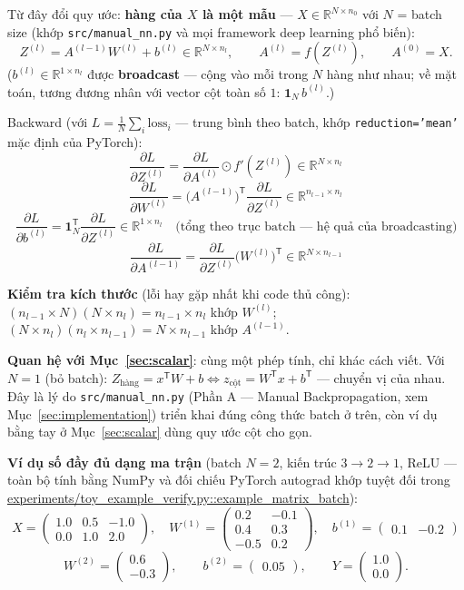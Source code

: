 \documentclass[12pt,a4paper]{report}
\newcommand{\T}{^{\mathsf{T}}}
\begin{document}
Từ đây đổi quy ước: \textbf{hàng của $X$ là một mẫu} ---
$X\in\mathbb R^{N\times n_0}$ với $N$ = batch size (khớp
\texttt{src/manual\_nn.py} và mọi framework deep learning phổ biến):
$$Z^{(l)} = A^{(l-1)}W^{(l)} + b^{(l)} \in \mathbb R^{N\times n_l},\qquad
A^{(l)} = f(Z^{(l)}),\qquad A^{(0)}=X.$$
($b^{(l)}\in\mathbb R^{1\times n_l}$ được \textbf{broadcast} --- cộng vào
mỗi trong $N$ hàng như nhau; về mặt toán, tương đương nhân với vector cột
toàn số $1$: $\mathbf 1_N\, b^{(l)}$.)

Backward (với $L=\tfrac1N\sum_i \mathrm{loss}_i$ --- trung bình theo batch,
khớp \texttt{reduction='mean'} mặc định của PyTorch):
$$\frac{\partial L}{\partial Z^{(l)}} = \frac{\partial L}{\partial A^{(l)}}\odot f'(Z^{(l)}) \in \mathbb R^{N\times n_l}$$
$$\frac{\partial L}{\partial W^{(l)}} = \big(A^{(l-1)}\big)\T\frac{\partial L}{\partial Z^{(l)}} \in \mathbb R^{n_{l-1}\times n_l}$$
$$\frac{\partial L}{\partial b^{(l)}} = \mathbf 1_N\T\frac{\partial L}{\partial Z^{(l)}} \in \mathbb R^{1\times n_l}\quad\text{(tổng theo trục batch --- hệ quả của broadcasting)}$$
$$\frac{\partial L}{\partial A^{(l-1)}} = \frac{\partial L}{\partial Z^{(l)}}\big(W^{(l)}\big)\T \in \mathbb R^{N\times n_{l-1}}$$

\textbf{Kiểm tra kích thước} (lỗi hay gặp nhất khi code thủ công):
$(n_{l-1}\times N)(N\times n_l)=n_{l-1}\times n_l$ khớp $W^{(l)}$;
$(N\times n_l)(n_l\times n_{l-1})=N\times n_{l-1}$ khớp $A^{(l-1)}$.

\textbf{Quan hệ với Mục~\ref{sec:scalar}}: cùng một phép tính, chỉ khác
cách viết. Với $N=1$ (bỏ batch): $Z_{\text{hàng}} = x\T W+b
\Leftrightarrow z_{\text{cột}} = W\T x+b\T$ --- chuyển vị của nhau. Đây là
lý do \texttt{src/manual\_nn.py} (Phần A --- Manual Backpropagation, xem
Mục~\ref{sec:implementation}) triển khai đúng công thức batch ở trên, còn
ví dụ bằng tay ở Mục~\ref{sec:scalar} dùng quy ước cột cho gọn.

\textbf{Ví dụ số đầy đủ dạng ma trận} (batch $N=2$, kiến trúc
$3\to2\to1$, ReLU --- toàn bộ tính bằng NumPy và đối chiếu PyTorch
autograd khớp tuyệt đối trong
\url{experiments/toy_example_verify.py::example_matrix_batch}):
$$X=\begin{pmatrix}1.0 & 0.5 & -1.0\\ 0.0 & 1.0 & 2.0\end{pmatrix},\quad
W^{(1)}=\begin{pmatrix}0.2 & -0.1\\ 0.4 & 0.3\\ -0.5 & 0.2\end{pmatrix},\quad
b^{(1)}=\begin{pmatrix}0.1 & -0.2\end{pmatrix}$$
$$W^{(2)}=\begin{pmatrix}0.6\\ -0.3\end{pmatrix},\qquad
b^{(2)}=\begin{pmatrix}0.05\end{pmatrix},\qquad
Y=\begin{pmatrix}1.0\\ 0.0\end{pmatrix}.$$
\end{document}
